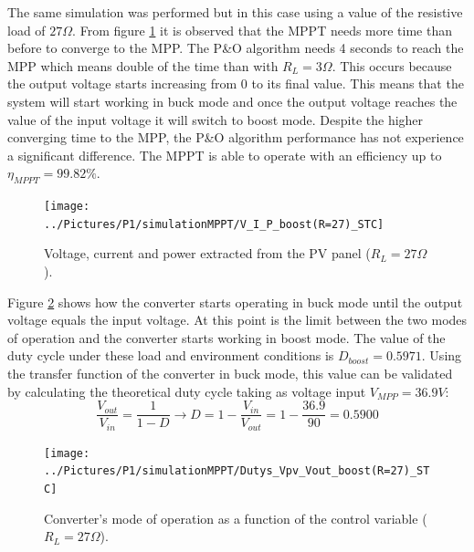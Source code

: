 The same simulation was performed but in this case using a value of the resistive load of $27\Omega$. From figure \ref{boostSTC} it is observed that the MPPT needs more time than before to converge to the MPP. The P\&O algorithm needs 4 seconds to reach the MPP which means double of the time than with $R_{L}=3\Omega$. This occurs because the output voltage starts increasing from 0 to its final value. This means that the system will start working in buck mode and once the output voltage reaches the value of the input voltage it will switch to boost mode. Despite the higher converging time to the MPP, the P\&O algorithm performance has not experience a significant difference. The MPPT is able to operate with an efficiency up to $\eta_{MPPT} = 99.82\% $.



\begin{figure}[H]
	\begin{center}
		\texttt{[image: ../Pictures/P1/simulationMPPT/V\_I\_P\_boost(R=27)\_STC]}
		\caption{Voltage, current and power extracted from the PV panel ($R_{L}=27\Omega$).}
		\label{boostSTC} 
	\end{center}	
\end{figure}

Figure \ref{boostSTC_duty} shows how the converter starts operating in buck mode until the output voltage equals the input voltage. At this point is the limit between the two modes of operation and the converter starts working in boost mode. The value of the duty cycle under these load and environment conditions is $D_{boost}= 0.5971$. Using the transfer function of the converter in  buck mode, this value can be validated by calculating the theoretical duty cycle taking as voltage input $V_{MPP}=36.9 V$: 
\begin{equation}
\frac{V_{out}}{V_{in}}= \frac{1}{1-D} \rightarrow D = 1 - \frac{V_{in}}{V_{out}} = 1 - \frac{36.9}{90} = 0.5900
\end{equation}
 
\begin{figure}[H]
	\begin{center}
		\texttt{[image: ../Pictures/P1/simulationMPPT/Dutys\_Vpv\_Vout\_boost(R=27)\_STC]}
		\caption{Converter's mode of operation as a function of the control variable ($R_{L}=27\Omega$).}
		\label{boostSTC_duty} 
	\end{center}	
\end{figure}


